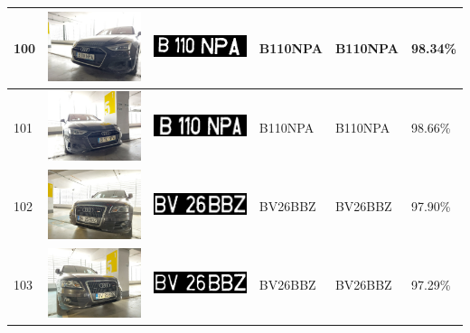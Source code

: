\documentclass[a4paper,12pt]{report}
\begin{document}
\begin{longtable}{| m{0.6cm} | m{3cm} | m{3cm} | m{1.8cm} | m{1.8cm} | m{1.8cm} |}
    100 & \includegraphics[width=3cm,keepaspectratio]{dataset/59_d1.jpg}  & \includegraphics[width=3cm,keepaspectratio]{segmentari/100.jpg} & B110NPA             & B110NPA              & 98.34\%    \\ \hline
    101 & \includegraphics[width=3cm,keepaspectratio]{dataset/59_s1.jpg}  & \includegraphics[width=3cm,keepaspectratio]{segmentari/101.jpg} & B110NPA             & B110NPA              & 98.66\%    \\ \hline
    102 & \includegraphics[width=3cm,keepaspectratio]{dataset/60_d1.jpg}  & \includegraphics[width=3cm,keepaspectratio]{segmentari/102.jpg} & BV26BBZ             & BV26BBZ              & 97.90\%    \\ \hline
    103 & \includegraphics[width=3cm,keepaspectratio]{dataset/60_s1.jpg}  & \includegraphics[width=3cm,keepaspectratio]{segmentari/103.jpg} & BV26BBZ             & BV26BBZ              & 97.29\%    \\ \hline

\end{longtable}
\end{document}
